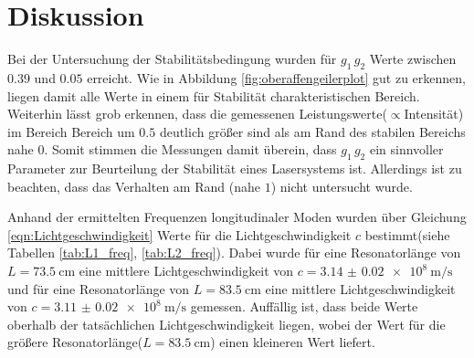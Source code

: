 \section{Diskussion}
\label{sec:Diskussion}

Bei der Untersuchung der Stabilitätsbedingung wurden für $g_{1} \, g_{2}$
Werte zwischen $0.39$ und $0.05$ erreicht.
Wie in Abbildung \ref{fig:oberaffengeilerplot} gut zu erkennen, liegen damit alle Werte
in einem für Stabilität charakteristischen Bereich.
Weiterhin lässt grob erkennen, dass die gemessenen Leistungswerte($\propto$Intensität)
im Bereich Bereich um $0.5$ deutlich größer sind als am Rand des stabilen Bereichs nahe $0$.
Somit stimmen die Messungen damit überein, dass $g_{1} \, g_{2}$ ein sinnvoller Parameter zur
Beurteilung der Stabilität eines Lasersystems ist. Allerdings ist zu beachten, dass das Verhalten am
Rand (nahe $1$) nicht untersucht wurde.


Anhand der ermittelten Frequenzen longitudinaler Moden wurden über Gleichung \eqref{eqn:Lichtgeschwindigkeit}
Werte für die Lichtgeschwindigkeit $c$ bestimmt(siehe Tabellen \ref{tab:L1_freq}, \ref{tab:L2_freq}).
Dabei wurde für eine Resonatorlänge von $L = \SI{73.5}{\centi\meter}$ eine mittlere
Lichtgeschwindigkeit von $ c = \SI{3.14(2) e8}{\meter\per\second}$
und für eine Resonatorlänge von $L = \SI{83.5}{\centi\meter}$ eine mittlere
Lichtgeschwindigkeit von $ c = \SI{3.11(2) e8}{\meter\per\second}$ gemessen.
Auffällig ist, dass beide Werte oberhalb der tatsächlichen Lichtgeschwindigkeit
liegen, wobei der Wert für die größere Resonatorlänge($L = \SI{83.5}{\centi\meter}$)
einen kleineren Wert liefert.





